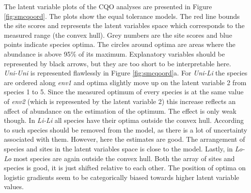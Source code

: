 		The latent variable plots of the CQO analyses  are presented in Figure \ref{fig:smcqoord}.
		The plots show the equal tolerance models.
		The red line bounds the site scores and represents the latent variables space which corresponds to the measured range (the convex hull).
		Grey numbers are the site scores and blue points indicate species optima. The circles around optima are areas where the abundance is above 95\% of its maximum.
		Explanatory variables should be represented by black arrows, but they are too short to be interpretable here. \\
		\textit{Uni-Uni} is represented flawlessly in Figure \ref{fig:smcqoord}a. 
		For \textit{Uni-Li} the species are ordered along \textit{env1} and optima slightly move up on the latent variable 2 from species 1 to 5.
		Since the measured optimum of every species is at the same value of \textit{env2} (which is represented by the latent variable 2) this increase reflects an affect of abundance on the estimation of the optimum. 
		The effect is only weak though.
		In \textit{Li-Li} all species have their optima outside the convex hull. 
		According to \citet{yee2015vector} such species should be removed from the model, as there is a lot of uncertainty associated with them. 
		However, here the estimates are good. 
		The arrangement of species and sites in the latent variables space is close to the model.
		Lastly, in \textit{Lo-Lo} most species are again outside the convex hull. 
		Both the array of sites and species is good, it is just shifted relative to each other. 
		The position of optima on logistic gradients seem to be categorically biased towards higher latent variable values.
	
